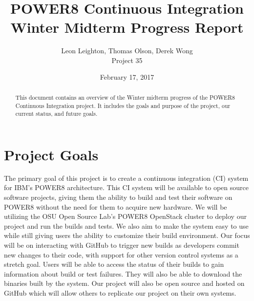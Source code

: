 \documentclass[10pt,onecolumn,journal,draftclsnofoot]{IEEEtran}
\begin{document}
\begin{titlepage}
  \title{POWER8 Continuous Integration\\ Winter Midterm Progress Report}
  \author{Leon Leighton, Thomas Olson, Derek Wong\\Project 35}
  \date{February 17, 2017}
  \maketitle
  \vspace{4cm}
  \begin{abstract}
  \noindent This document contains an overview of the Winter midterm progress of the POWER8 Continuous Integration project.
    It includes the goals and purpose of the project, our current status, and future goals.
 \end{abstract}
\end{titlepage}

\tableofcontents
\clearpage

\section{Project Goals}
The primary goal of this project is to create a continuous integration (CI) system for IBM's POWER8 architecture.
This CI system will be available to open source software projects, giving them the ability to build and test their software on POWER8 without the need for them to acquire new hardware.
We will be utilizing the OSU Open Source Lab's POWER8 OpenStack cluster to deploy our project and run the builds and tests.
We also aim to make the system easy to use while still giving users the ability to customize their build environment.
Our focus will be on interacting with GitHub to trigger new builds as developers commit new changes to their code, with support for other version control systems as a stretch goal.
Users will be able to access the status of their builds to gain information about build or test failures.
They will also be able to download the binaries built by the system.
Our project will also be open source and hosted on GitHub which will allow others to replicate our project on their own systems.
\end{document}
